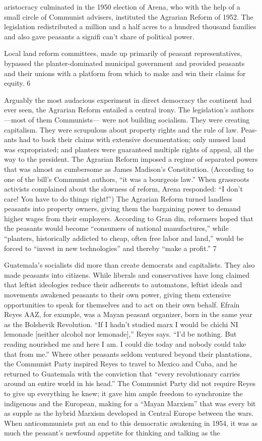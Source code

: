 aristocracy culminated in the 1950 election of Arena, who with the help of a small circle of Communist advisers, instituted the Agrarian Reform of 1952. The legislation redistributed a million and a half acres to a hundred thousand families and also gave peasants a signifi can't share of political power.{\par} Local land reform committees, made up primarily of peasant representatives, bypassed the planter-dominated municipal government and provided peasants and their unions with a platform from which to make and win their claims for equity. {\color{blue} 6 } {\par} Arguably the most audacious experiment in direct democracy the continent had ever seen, the Agrarian Reform entailed a central irony. The legislation’s authors—most of them Communists— were not building socialism. They were creating capitalism. They were scrupulous about property rights and the rule of law. Peas-ants had to back their claims with extensive documentation; only unused land was expropriated; and planters were guaranteed multiple rights of appeal, all the way to the president. The Agrarian Reform imposed a regime of separated powers that was almost as cumbersome as James Madison’s Constitution. (According to one of the bill’s Communist authors, “it was a bourgeois law.” When grassroots activists complained about the slowness of reform, Arena responded: “I don’t care! You have to do things right!”) The Agrarian Reform turned landless peasants into property owners, giving them the bargaining power to demand higher wages from their employers. According to Gran din, reformers hoped that the peasants would become “consumers of national manufactures,” while “planters, historically addicted to cheap, often free labor and land,” would be forced to “invest in new technologies” and thereby “make a profit.” {\color{blue} 7 } {\par} Guatemala’s socialists did more than create democrats and capitalists. They also made peasants into citizens. While liberals and conservatives have long claimed that leftist ideologies reduce their adherents to automatons, leftist ideals and movements awakened peasants to their own power, giving them extensive opportunities to speak for themselves and to act on their own behalf. Efraín Reyes AAZ, for example, was a Mayan peasant organizer, born in the same year as the Bolshevik Revolution. “If I hadn’t studied marx I would be chichi NI lemonade [neither alcohol nor lemonade],” Reyes says. “I’d be nothing. But reading nourished me and here I am. I could die today and nobody could take that from me.” Where other peasants seldom ventured beyond their plantations, the Communist Party inspired Reyes to travel to Mexico and Cuba, and he returned to Guatemala with the conviction that “every revolutionary carries around an entire world in his head.” The Communist Party did not require Reyes to give up everything he knew; it gave him ample freedom to synchronize the indigenous and the European, making for a “Mayan Marxism” that was every bit as supple as the hybrid Marxism developed in Central Europe between the wars. When anticommunists put an end to this democratic awakening in 1954, it was as much the peasant’s newfound appetite for thinking and talking as the 